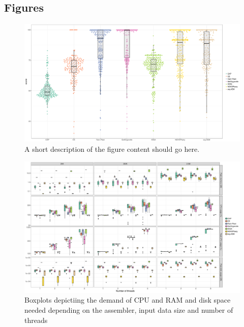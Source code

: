 \documentclass{bmcart}
\begin{document}
\begin{backmatter}



\section*{Figures}
  \begin{figure}[h!]
  \includegraphics[width=\textwidth]{plots/swarm.pdf}
  \caption{
      A short description of the figure content
      should go here.}
      \label{fig:swarmplot}
      \end{figure}

\begin{figure}[h!]
  \includegraphics[width=\textwidth]{plots/usage_amount_threads.pdf}
  \caption{
      Boxplots depictiing the demand of CPU and RAM and disk space needed depending on the assembler, input data size and number of threads}
      \label{fig:performance_memory_cpu}
      \end{figure}


\end{backmatter}
\end{document}
